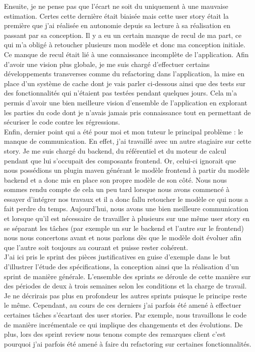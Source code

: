 	Ensuite, je ne pense pas que l'écart ne soit du uniquement à une mauvaise estimation. Certes cette dernière était biaisée mais cette user story était la première que j'ai réalisée en autonomie depuis sa lecture à sa réalisation en passant par sa conception. Il y a eu un certain manque de recul de ma part, ce qui m'a obligé à retoucher plusieurs mon modèle et donc ma conception initiale. Ce manque de recul était lié à une connaissance incomplète de l'application. Afin d'avoir une vision plus globale, je me suis chargé d'effectuer certains développements transverses comme du refactoring dans l'application, la mise en place d'un système de cache dont je vais parler ci-dessous ainsi que des tests sur des fonctionnalités qui n'étaient pas testées pendant quelques jours. Cela m'a permis d'avoir une bien meilleure vision d'ensemble de l'application en explorant les parties du code dont je n'avais jamais pris connaissance tout en permettant de sécuriser le code contre les régressions. \\
	
	Enfin, dernier point qui a été pour moi et mon tuteur le principal problème : le manque de communication. En effet, j'ai travaillé avec un autre stagiaire sur cette story. Je me suis chargé du backend, du référentiel et du moteur de calcul pendant que lui s'occupait des composants frontend. Or, celui-ci ignorait que nous possédions un plugin maven générant le modèle frontend à partir du modèle backend et a donc mis en place son propre modèle de son côté. Nous nous sommes rendu compte de cela un peu tard lorsque nous avons commencé à essayer d'intégrer nos travaux et il a donc fallu retoucher le modèle ce qui nous a fait perdre du temps. Aujourd'hui, nous avons une bien meilleure communication et lorsque qu'il est nécessaire de travailler à plusieurs sur une même user story en se séparant les tâches (par exemple un sur le backend et l'autre sur le frontend) nous nous concertons avant et nous parlons dès que le modèle doit évoluer afin que l'autre soit toujours au courant et puisse rester cohérent. \\

	J'ai ici pris le sprint des pièces justificatives en guise d'exemple dans le but d'illustrer l'étude des spécifications, la conception ainsi que la réalisation d'un sprint de manière générale. L'ensemble des sprints se déroule de cette manière sur des périodes de deux à trois semaines selon les conditions et la charge de travail. Je ne décrirais pas plus en profondeur les autres sprints puisque le principe reste le même. Cependant, au cours de ces derniers j'ai parfois été amené à effectuer certaines tâches s'écartant des user stories. Par exemple, nous travaillons le code de manière incrémentale ce qui implique des changements et des évolutions. De plus, lors des sprint review nous tenons compte des remarques client c'est pourquoi j'ai parfois été amené à faire du refactoring sur certaines fonctionnalités. \\
	
